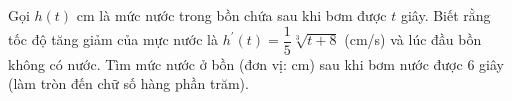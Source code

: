\begin{ex}%
Gọi $h(t)$ cm là mức nước trong bồn chứa sau khi bơm được $t$ giây. Biết rằng tốc độ tăng giảm của mực nước là $h^{\prime}(t)=\dfrac{1}{5} \sqrt[3]{t+8}$ (cm/s) và lúc đầu bồn không có nước. Tìm mức nước ở bồn (đơn vị: cm) sau khi bơm nước được $6$ giây (làm tròn đến chữ số hàng phần trăm).
\end{ex}

